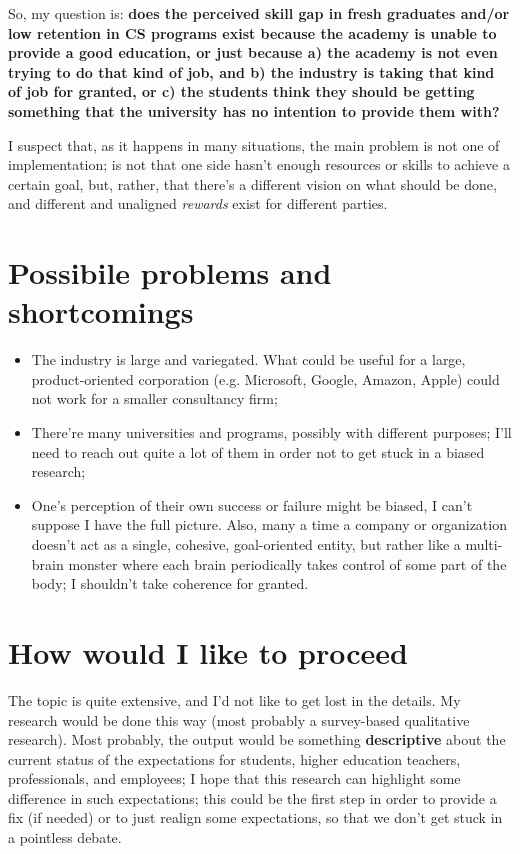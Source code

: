 \documentclass[12pt,a4paper,titlepage]{article}
\begin{document}
So, my question is: \textbf{does the perceived skill gap in fresh graduates and/or low retention in CS programs exist because the academy is unable to provide a good education, or just because a) the academy is not even trying to do that kind of job, and b) the industry is taking that kind of job for granted, or c) the students think they should be getting something that the university has no intention to provide them with?}\newline

I suspect that, as it happens in many situations, the main problem is not one of implementation; is not that one side hasn't enough resources or skills to achieve a certain goal, but, rather, that there's a different vision on what should be done, and different and unaligned \textit{rewards} exist for different parties.


\section*{Possibile problems and shortcomings}
\begin{itemize}
	\item The industry is large and variegated. What could be useful for a large, product-oriented corporation (e.g. Microsoft, Google, Amazon, Apple) could not work for a smaller consultancy firm;
	\item There're many universities and programs, possibly with different purposes; I'll need to reach out quite a lot of them in order not to get stuck in a biased research;
	\item One's perception of their own success or failure might be biased, I can't suppose I have the full picture. Also, many a time a company or organization doesn't act as a single, cohesive, goal-oriented entity, but rather like a multi-brain monster where each brain periodically takes control of some part of the body; I shouldn't take coherence for granted.
\end{itemize}

\section*{How would I like to proceed}
The topic is quite extensive, and I'd not like to get lost in the details. My research would be done this way (most probably a survey-based qualitative research). Most probably, the output would be something \textbf{descriptive} about the current status of the expectations for students, higher education teachers, professionals, and employees; I hope that this research can highlight some difference in such expectations; this could be the first step in order to provide a fix (if needed) or to just realign some expectations, so that we don't get stuck in a pointless debate.
\end{document}

